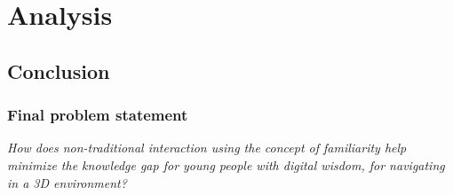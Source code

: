 \chapter{Analysis}






\section{Conclusion}
\subsection{Final problem statement}
\textit{How does non-traditional interaction using the concept of familiarity help minimize the knowledge gap for young people with digital wisdom, for navigating in a 3D environment?}